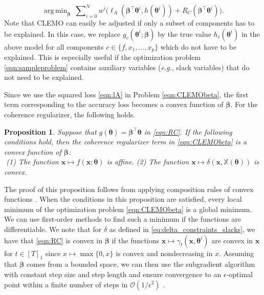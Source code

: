 \documentclass{article}
\DeclareMathOperator*{\argmin}{arg\,min}
\theoremstyle{plain}
\newtheorem{proposition}[theorem]{Proposition}
\theoremstyle{definition}
\theoremstyle{remark}
\begin{document}
\begin{equation}
\label{eqn:CLEMObeta}
\argmin_{\bm{\beta}} ~ \sum\nolimits_{i=0}^N w^i \big(\ell_A(\bm{\beta}^\intercal\bm{\theta}^i, h(\bm{\theta}^i)) + R_C(\bm{\beta}^\intercal\bm{\theta}^i)\big).
\end{equation}
Note that CLEMO can easily be adjusted if only a subset of components has to be explained. In this case, we replace $g_{c}(\bm{\theta}^i;\bm{\beta})$ by the true value $h_c(\bm{\theta}^i)$ in the above model for all components $c\in \{f,x_1,\dots,x_p\}$ which do not have to be explained. This is especially useful if the optimization problem \eqref{eqn:sampleproblem} contains auxiliary variables (\textit{e.g.}, slack variables) that do not need to be explained.

Since we use the squared loss \eqref{eqn:lA} in Problem \eqref{eqn:CLEMObeta}, the first term corresponding to the accuracy loss becomes a convex function of $\bm{\beta}$. For the coherence regularizer, the following holds.
\begin{proposition}\label{prop:convex}
Suppose that $g(\bm{\theta})=\bm{\beta}^\intercal\bm{\theta}$ in \eqref{eqn:RC}. If the following conditions hold, then the coherence regularizer term in \eqref{eqn:CLEMObeta} is a convex function of $\bm{\beta}$:\\
    \textcolor{white}{.\quad}(1) The function $\bm{x} \mapsto f(\bm{x}; \bm{\theta})$ is affine. \qquad
    (2) The function $\bm{x} \mapsto \delta(\bm{x}, \mathbb{X}( \bm{\theta}))$ is convex.
\end{proposition}
The proof of this proposition follows from applying composition rules of convex functions \cite{boyd2004convex}. When the conditions in this proposition are satisfied, every local minimum of the optimization problem \eqref{eqn:CLEMObeta} is a global minimum. We can use first-order methods to find such a minimum if the functions are differentiable. We note that for $\delta$ as defined in \eqref{eq:delta_constraints_slacks}, we have that \eqref{eqn:RC} is convex in $\bm{\beta}$ if the functions $\bm{x}\mapsto\gamma_t(\bm{x},\bm{\theta}^i)$ are convex in $\bm{x}$ for $t\in[T]_1$ since $x \mapsto \max\{0, x\}$ is convex and nondecreasing in $x$. Assuming that $\bm{\beta}$ comes from a bounded space, we can then use the subgradient algorithm with constant step size and step length and ensure convergence to an $\epsilon$-optimal point within a finite number of steps in $\mathcal{O}(1/\epsilon^2)$ \cite{boyd2003subgradient}. 
\end{document}

